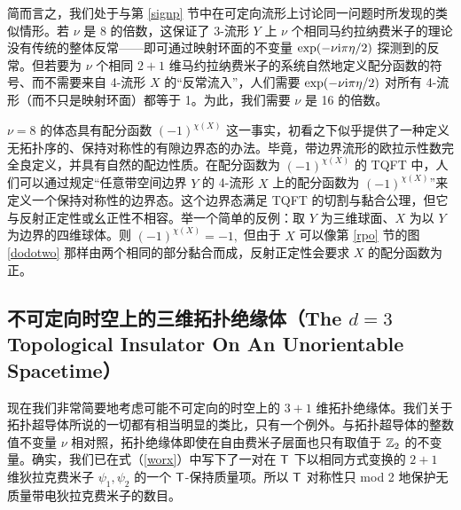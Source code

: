 
简而言之，我们处于与第 \ref{signp} 节中在可定向流形上讨论同一问题时所发现的类似情形。若 $\nu$ 是 8 的倍数，这保证了 3-流形 $Y$ 上 $\nu$ 个相同马约拉纳费米子的理论没有传统的整体反常——即可通过映射环面的不变量 $\exp(-\nu{\mathrm i}\pi \eta/2)$ 探测到的反常。但若要为 $\nu$ 个相同 $2+1$ 维马约拉纳费米子的系统自然地定义配分函数的符号、而不需要来自 4-流形 $X$ 的“反常流入”，人们需要 $\exp(-\nu{\mathrm i}\pi \eta/2)$ 对所有 4-流形（而不只是映射环面）都等于 1。为此，我们需要 $\nu$ 是 16 的倍数。


$\nu=8$ 的体态具有配分函数 $(-1)^{\chi(X)}$ 这一事实，初看之下似乎提供了一种定义无拓扑序的、保持对称性的有隙边界态的办法。毕竟，带边界流形的欧拉示性数完全良定义，并具有自然的配边性质。在配分函数为 $(-1)^{\chi(X)}$ 的 TQFT 中，人们可以通过规定“任意带空间边界 $Y$ 的 4-流形 $X$ 上的配分函数为 $(-1)^{\chi(X)}$”来定义一个保持对称性的边界态。这个边界态满足 TQFT 的切割与黏合公理，但它与反射正定性或幺正性不相容。举一个简单的反例：取 $Y$ 为三维球面、$X$ 为以 $Y$ 为边界的四维球体。则 $(-1)^{\chi(X)}=-1,$ 但由于 $X$ 可以像第 \ref{rpo} 节的图 \ref{dodotwo} 那样由两个相同的部分黏合而成，反射正定性会要求 $X$ 的配分函数为正。


\subsection{不可定向时空上的三维拓扑绝缘体（The $d=3$ Topological Insulator On An Unorientable Spacetime）}\label{topsupun}

现在我们非常简要地考虑可能不可定向的时空上的 $3+1$ 维拓扑绝缘体。我们关于拓扑超导体所说的一切都有相当明显的类比，只有一个例外。与拓扑超导体的整数值不变量 $\nu$ 相对照，拓扑绝缘体即使在自由费米子层面也只有取值于 ${\mathbb{Z}}_2$ 的不变量。确实，我们已在式（\ref{worx}）中写下了一对在 ${\sf T}$ 下以相同方式变换的 $2+1$ 维狄拉克费米子 $\psi_1,\psi_2$ 的一个 ${\sf T}$-保持质量项。所以 ${\sf T}$ 对称性只 mod 2 地保护无质量带电狄拉克费米子的数目。

